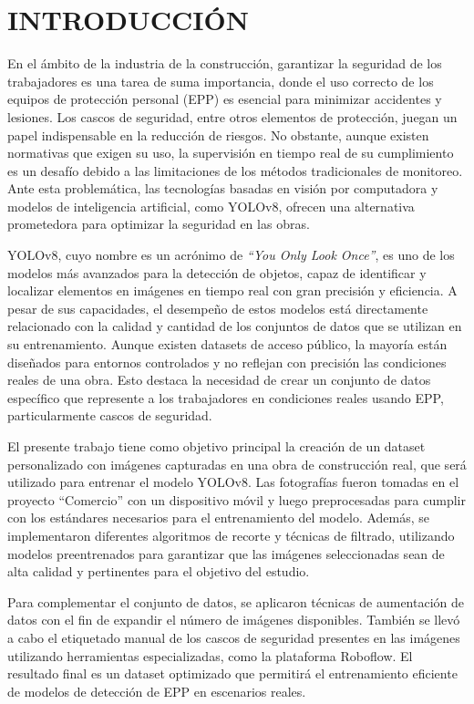 \chapter{INTRODUCCIÓN}
En el ámbito de la industria de la construcción, garantizar la seguridad de los trabajadores es una tarea de suma importancia, donde el uso correcto de los equipos de protección personal (EPP) es esencial para minimizar accidentes y lesiones. Los cascos de seguridad, entre otros elementos de protección, juegan un papel indispensable en la reducción de riesgos. No obstante, aunque existen normativas que exigen su uso, la supervisión en tiempo real de su cumplimiento es un desafío debido a las limitaciones de los métodos tradicionales de monitoreo. Ante esta problemática, las tecnologías basadas en visión por computadora y modelos de inteligencia artificial, como YOLOv8, ofrecen una alternativa prometedora para optimizar la seguridad en las obras.

YOLOv8, cuyo nombre es un acrónimo de \textit{``You Only Look Once''}, es uno de los modelos más avanzados para la detección de objetos, capaz de identificar y localizar elementos en imágenes en tiempo real con gran precisión y eficiencia. A pesar de sus capacidades, el desempeño de estos modelos está directamente relacionado con la calidad y cantidad de los conjuntos de datos que se utilizan en su entrenamiento. Aunque existen datasets de acceso público, la mayoría están diseñados para entornos controlados y no reflejan con precisión las condiciones reales de una obra. Esto destaca la necesidad de crear un conjunto de datos específico que represente a los trabajadores en condiciones reales usando EPP, particularmente cascos de seguridad.

El presente trabajo tiene como objetivo principal la creación de un dataset personalizado con imágenes capturadas en una obra de construcción real, que será utilizado para entrenar el modelo YOLOv8. Las fotografías fueron tomadas en el proyecto ``Comercio'' con un dispositivo móvil y luego preprocesadas para cumplir con los estándares necesarios para el entrenamiento del modelo. Además, se implementaron diferentes algoritmos de recorte y técnicas de filtrado, utilizando modelos preentrenados para garantizar que las imágenes seleccionadas sean de alta calidad y pertinentes para el objetivo del estudio.

Para complementar el conjunto de datos, se aplicaron técnicas de aumentación de datos con el fin de expandir el número de imágenes disponibles. También se llevó a cabo el etiquetado manual de los cascos de seguridad presentes en las imágenes utilizando herramientas especializadas, como la plataforma Roboflow. El resultado final es un dataset optimizado que permitirá el entrenamiento eficiente de modelos de detección de EPP en escenarios reales.

